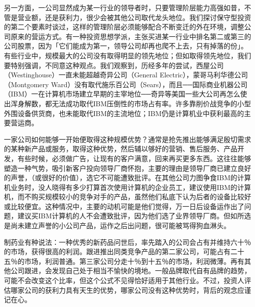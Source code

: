 \documentclass[UTF8,a4paper,zihao=-4,fontset = windows]{ctexart} %
\begin{document}
另一方面，一公司显然成为某一行业的领导者时，只要管理阶层能力高强如昔，不管是营业额，还是获利力，很少会被其他公司取代龙头地位。我们探讨保守型投资的第二个要素时谈过，这样的管理阶层必须能够配合不断变迁的外在环境，调整公司原来的营运方式。有一种投资思想学派，主张买进某一行业中排名第二或第三的公司股票，因为「它们能成为第一，领导公司却再也爬不上去，只有掉落的份」。有些行业中，规模最大的公司没有取得明显的领先地位；但如取得领先地位，我们要特别强调，不同意这种观点。我们观察到，历经多年的尝试，西屋公司（Westinghouse）一直未能超越奇异公司（General Electric），蒙哥马利华德公司（Montgomery Ward）没有取代施乐百公司（Sears），而且──国际商业机器公司（IBM）一在计算机市场建立早期的主宰地位──奇异等美国一些大公司再怎么使出浑身解数，都无法成功取代IBM压倒性的市场占有率。许多靠削价战竞争的小型外围设备供货商，也未能取代IBM的主流地位；IBM仍是计算机业中获利最高的主要营运商。

一家公司如何能够一开始便取得这种规模优势？通常是抢先推出能够满足殷切需求的某种新产品或服务，取得这种优势，然后辅以够好的营销、售后服务、产品开发，有些时候，必须做广告，让现有的客户满意，回来再买更多东西。这往往能够塑造一种气势，吸引新客户投向领导厂商怀抱，主要的理由是领导厂商已建立良好的声誉，（或很好的价值），选它不可能遭致批评。在其他公司力图争食IBM的计算机业务时，没人晓得有多少打算首次使用计算机的企业员工，建议使用IBM的计算机，而不购买规模较小的竞争对手的产品，虽然他们私底下认为后者的设备比较好或比较便宜。这种情况中，主要的动机可能是他们觉得，万一日后设备运作出了问题，建议买IBM计算机的人不会遭致批评，因为他们选了业界领导厂商。但如所选是尚未建立声誉的小公司产品，运作之后出问题，很可能被骂得狗血淋头。

制药业有种说法：一种优秀的新药品问世后，率先踏入的公司会占有并维持六十％的市场，获得很高的利润。跟进推出同类竞争产品的第二家公司，可能占有二十五％的市场，利润普通。第三家公司分走十％到十五％的市场，利润微薄。再有其他公司跟进，会发现自己处于相当不愉快的境地。一般品牌取代自有品牌的趋势，可能不会改变这个比率，但这个公式不见得恰好适用于其他行业。不过，投资人评估哪家公司的获利力具有天生的优势，哪家公司没有这种优势时，背后的观念应谨记在心。
\end{document}
